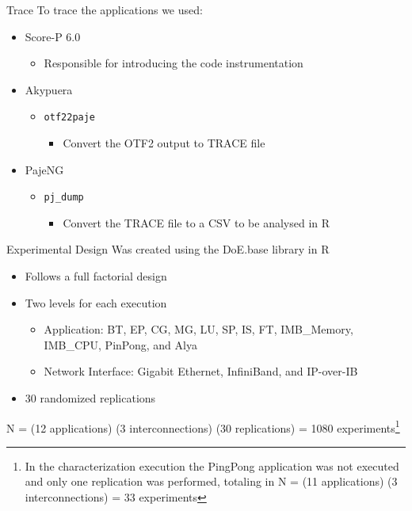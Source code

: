 \documentclass[presentation]{beamer}
\begin{document}
\begin{frame}{Trace}
To trace the applications we used: 
    \pause \vfill
    \begin{itemize}
        \item Score-P 6.0
        \begin{itemize}
            \item Responsible for introducing the code instrumentation
        \end{itemize}
    \pause \vfill
        \item Akypuera
        \begin{itemize}
            \item \texttt{otf22paje}
                \begin{itemize}
                    \item Convert the OTF2 output to TRACE file
                \end{itemize}
        \end{itemize}
    \pause \vfill
        \item PajeNG
        \begin{itemize}
            \item \texttt{pj\_dump}
                \begin{itemize}
                    \item Convert the TRACE file to a CSV to be analysed in R
                \end{itemize}
        \end{itemize}
    \end{itemize}
\end{frame}


\begin{frame}{Experimental Design}
\vfill
Was created using the DoE.base library in R
\begin{itemize}
    \item Follows a full factorial design
    \item Two levels for each execution
 \begin{itemize}
\item Application: \alert{BT}, \alert{EP}, \alert{CG}, \alert{MG}, \alert{LU}, \alert{SP}, \alert{IS}, \alert{FT}, \alert{IMB\_Memory}, \alert{IMB\_CPU}, \alert{PinPong}, and \alert{Alya}
\item Network Interface: \alert{Gigabit Ethernet}, \alert{InfiniBand}, and \alert{IP-over-IB}
\end{itemize}
    \item 30 randomized replications
   \end{itemize}
N = (12 applications) \texttimes{} (3 interconnections) \texttimes{} (30 replications) = 1080 experiments\footnote{In the characterization execution the PingPong application was not executed and only one replication was performed, totaling in N = (11 applications) \texttimes{} (3 interconnections) = 33 experiments}   
\vfill
\end{frame}
\end{document}
